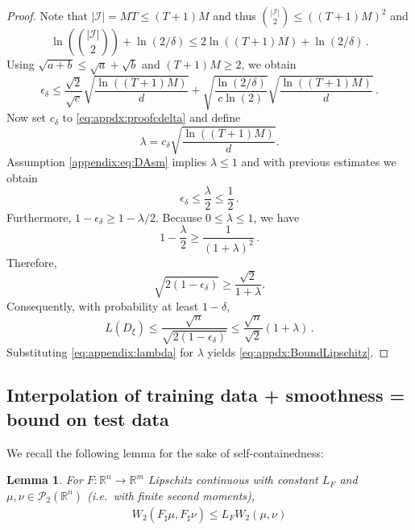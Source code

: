 \documentclass{article}
\theoremstyle{plain}
\newtheorem{lemma}[theorem]{Lemma}
\theoremstyle{definition}
\theoremstyle{remark}
\newcommand{\bR}{\mathbb{R}}
\begin{document}
\begin{proof}
    Note that $|\mathcal{I}| = MT \leq (T + 1)M$ and thus $\binom{|\mathcal{I}|}{2} \leq ((T + 1)M)^2$ and
    \[
    \ln\left(\binom{|\mathcal{I}|}{2}\right) + \ln(2/\delta)  \leq 2\ln((T + 1)M) + \ln(2/\delta)\,.
    \]
    Using $\sqrt{a + b} \leq \sqrt{a} + \sqrt{b}$ and $(T + 1)M \geq 2$, we obtain
    \[
    \epsilon_{\delta} \leq \frac{\sqrt{2}}{\sqrt{c}}\sqrt{\frac{\ln((T + 1)M)}{d}} + \sqrt{\frac{\ln(2/\delta)}{c\ln(2)}}\sqrt{\frac{\ln((T + 1)M)}{d}}\,.
    \]
    Now set $c_{\delta}$ to \eqref{eq:appdx:proofcdelta} and  define 
    \begin{equation}
    \label{eq:appendix:lambda}
    \lambda = c_{\delta} \sqrt{\frac{\ln((T + 1)M)}{d}}.
    \end{equation}
    Assumption \eqref{appendix:eq:DAsm} implies $\lambda \leq 1$ and with previous estimates we obtain
\[
\epsilon_{\delta} \leq \frac{\lambda}{2} \leq \frac{1}{2}\,.
\]
Furthermore, $1 - \epsilon_{\delta} \geq 1 - \lambda/2$. Because $0 \leq \lambda \leq 1$, we have
\[
1 - \frac{\lambda}{2} \geq \frac{1}{(1 + \lambda)^2}\,.
\]
Therefore,
\[
\sqrt{2(1 - \epsilon_{\delta})} \geq \frac{\sqrt{2}}{1 + \lambda}.
\]
Consequently, with probability at least $1 - \delta$, 
\[
L(D_{\xi}) \leq \frac{\sqrt{n}}{\sqrt{2(1 - \epsilon_{\delta})}} \leq \frac{\sqrt{n}}{\sqrt{2}}\left(1 + \lambda\right)\,.
\]
Substituting \eqref{eq:appendix:lambda} for $\lambda$ yields \eqref{eq:appdx:BoundLipschitz}. 
\end{proof}

\subsection{Interpolation of training data + smoothness = bound on test data}\label{appdx:ProofInterSmoothGen}

We recall the following lemma for the sake of self-containedness:

\begin{lemma}
  \label{lemma:appdx:lipschitzW2}
  For $F: \bR^n \to \bR^m$ Lipschitz continuous with constant $L_F$ and $\mu, \nu \in \mathcal P_2(\bR^n)$ (i.e.\ with finite second moments),
  \begin{align}
    W_2(F _\sharp \mu, F _\sharp \nu) \leq L_F W_2(\mu, \nu)
  \end{align}
\end{lemma}
\end{document}
